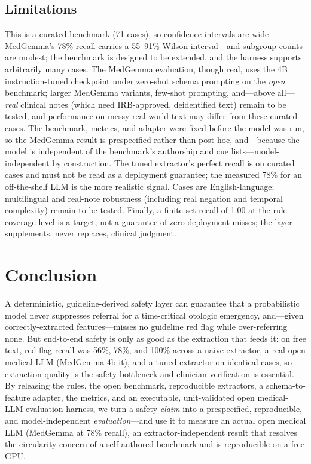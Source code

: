 \documentclass[11pt]{article}
\begin{document}
\subsection{Limitations}
This is a curated benchmark (71 cases), so confidence intervals are wide---MedGemma's 78\% recall carries a 55--91\% Wilson interval---and subgroup counts are modest; the benchmark is designed to be extended, and the harness supports arbitrarily many cases. The MedGemma evaluation, though real, uses the 4B instruction-tuned checkpoint under zero-shot schema prompting on the \emph{open} benchmark; larger MedGemma variants, few-shot prompting, and---above all---\emph{real} clinical notes (which need IRB-approved, deidentified text) remain to be tested, and performance on messy real-world text may differ from these curated cases. The benchmark, metrics, and adapter were fixed before the model was run, so the MedGemma result is prespecified rather than post-hoc, and---because the model is independent of the benchmark's authorship and cue lists---model-independent by construction. The tuned extractor's perfect recall is on curated cases and must not be read as a deployment guarantee; the measured 78\% for an off-the-shelf LLM is the more realistic signal. Cases are English-language; multilingual and real-note robustness (including real negation and temporal complexity) remain to be tested. Finally, a finite-set recall of 1.00 at the rule-coverage level is a target, not a guarantee of zero deployment misses; the layer supplements, never replaces, clinical judgment.

\section{Conclusion}
A deterministic, guideline-derived safety layer can guarantee that a probabilistic model never suppresses referral for a time-critical otologic emergency, and---given correctly-extracted features---misses no guideline red flag while over-referring none. But end-to-end safety is only as good as the extraction that feeds it: on free text, red-flag recall was 56\%, 78\%, and 100\% across a naive extractor, a real open medical LLM (MedGemma-4b-it), and a tuned extractor on identical cases, so extraction quality is the safety bottleneck and clinician verification is essential. By releasing the rules, the open benchmark, reproducible extractors, a schema-to-feature adapter, the metrics, and an executable, unit-validated open medical-LLM evaluation harness, we turn a safety \emph{claim} into a prespecified, reproducible, and model-independent \emph{evaluation}---and use it to measure an actual open medical LLM (MedGemma at 78\% recall), an extractor-independent result that resolves the circularity concern of a self-authored benchmark and is reproducible on a free GPU.
\end{document}
